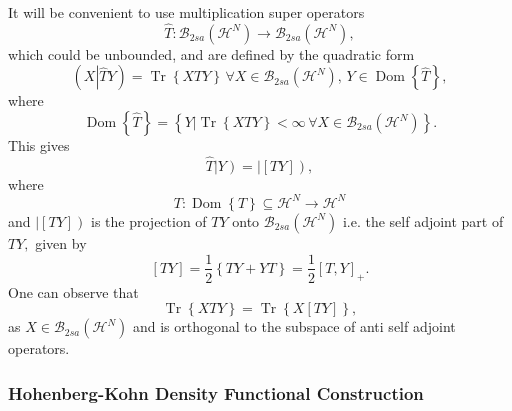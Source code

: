 \documentclass[aps,preprint]{revtex4}%
\begin{document}
It will be convenient to use multiplication super operators
\begin{equation}
\widehat{T}:\mathcal{B}_{2sa}\left(  \mathcal{H}^{N}\right)  \rightarrow
\mathcal{B}_{2sa}\left(  \mathcal{H}^{N}\right)  ,
\end{equation}
which could be unbounded, and are defined by the quadratic form
\cite{weiner05}
\begin{equation}
\left(  X\left\vert \widehat{T}Y\right.  \right)  =\operatorname{Tr}\left\{
XTY\right\}  \,\forall X\in\mathcal{B}_{2sa}\left(  \mathcal{H}^{N}\right)
,\,Y\in\operatorname{Dom}\left\{  \widehat{T}\right\}  ,
\end{equation}
where
\[
\operatorname{Dom}\left\{  \widehat{T}\right\}  =\left\{  \left.  Y\right\vert
\operatorname{Tr}\left\{  XTY\right\}  <\infty\,\forall X\in\mathcal{B}%
_{2sa}\left(  \mathcal{H}^{N}\right)  \right\}  .
\]
This gives
\begin{equation}
\widehat{T}\left\vert Y\right)  =\left\vert \left[  TY\right]  \right)  ,
\end{equation}
where
\begin{equation}
T:\operatorname{Dom}\left\{  T\right\}  \subseteq\mathcal{H}^{N}%
\rightarrow\mathcal{H}^{N}%
\end{equation}
and $\left\vert \left[  TY\right]  \right)  $ is the projection of $TY$ onto
$\mathcal{B}_{2sa}\left(  \mathcal{H}^{N}\right)  $ i.e. the self adjoint part
of $TY,$ given by
\[
\left[  TY\right]  =\frac{1}{2}\left\{  TY+YT\right\}  =\frac{1}{2}\left[
T,Y\right]  _{+}.
\]
One can observe that
\begin{equation}
\operatorname{Tr}\left\{  XTY\right\}  =\operatorname{Tr}\left\{  X\left[
TY\right]  \right\}  ,
\end{equation}
as $X\in\mathcal{B}_{2sa}\left(  \mathcal{H}^{N}\right)  $ and is orthogonal
to the subspace of anti self adjoint operators.

\subsubsection{Hohenberg-Kohn Density Functional Construction}
\end{document}
